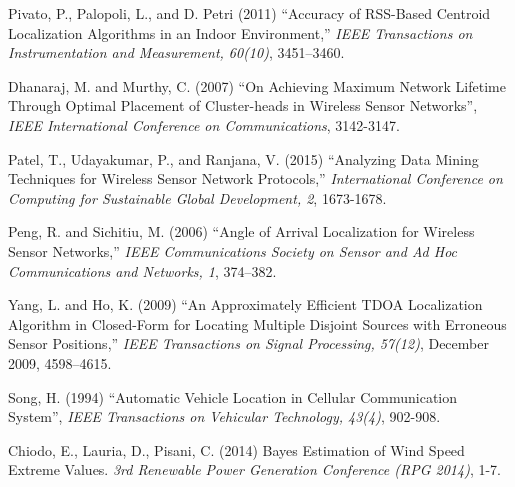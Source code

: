 \documentclass[12pt]{uthesis-v12}  %
\begin{document}
\begin{thebibliography}{00}


Pivato, P., Palopoli, L., and D. Petri (2011) ``Accuracy of RSS-Based Centroid  Localization Algorithms in an Indoor Environment,'' {\it IEEE Transactions on Instrumentation and Measurement, 60(10)}, 3451--3460.

Dhanaraj, M. and Murthy, C. (2007) ``On Achieving Maximum Network Lifetime Through Optimal Placement of Cluster-heads in Wireless Sensor Networks'', {\it IEEE International Conference on Communications}, 3142-3147. 



Patel, T., Udayakumar, P., and Ranjana, V. (2015) ``Analyzing Data Mining Techniques for Wireless Sensor Network Protocols,'' {\it International Conference on Computing for Sustainable Global Development, 2}, 1673-1678.

Peng, R. and Sichitiu, M. (2006) ``Angle of Arrival Localization for Wireless Sensor  Networks,'' {\it IEEE Communications Society on Sensor and Ad Hoc  Communications and Networks, 1}, 374--382.

Yang, L. and Ho, K. (2009) ``An Approximately Efficient {TDOA} Localization  Algorithm in Closed-Form for Locating Multiple Disjoint Sources with Erroneous Sensor Positions,'' {\it IEEE Transactions on Signal Processing, 57(12)}, December 2009, 4598--4615. 

Song, H. (1994) ``Automatic Vehicle Location in Cellular Communication System'', {\it IEEE Transactions on Vehicular Technology, 43(4)}, 902-908.

Chiodo, E., Lauria, D., Pisani, C. (2014) Bayes Estimation of Wind Speed Extreme Values. {\it 3rd Renewable Power Generation Conference (RPG 2014)}, 1-7.


\end{thebibliography}
\end{document}
